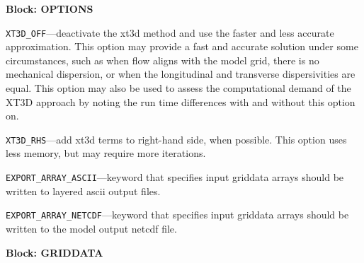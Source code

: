 
\item \textbf{Block: OPTIONS}

\begin{description}
\item \texttt{XT3D\_OFF}---deactivate the xt3d method and use the faster and less accurate approximation.  This option may provide a fast and accurate solution under some circumstances, such as when flow aligns with the model grid, there is no mechanical dispersion, or when the longitudinal and transverse dispersivities are equal.  This option may also be used to assess the computational demand of the XT3D approach by noting the run time differences with and without this option on.

\item \texttt{XT3D\_RHS}---add xt3d terms to right-hand side, when possible.  This option uses less memory, but may require more iterations.

\item \texttt{EXPORT\_ARRAY\_ASCII}---keyword that specifies input griddata arrays should be written to layered ascii output files.

\item \texttt{EXPORT\_ARRAY\_NETCDF}---keyword that specifies input griddata arrays should be written to the model output netcdf file.

\end{description}
\item \textbf{Block: GRIDDATA}

